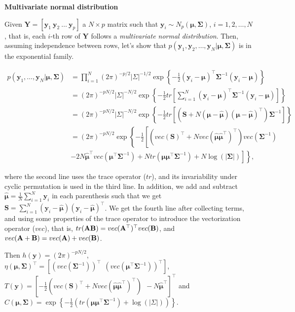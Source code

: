 \begin{enumerate}
\textbf{Multivariate normal distribution}

Given $\mathbf{Y}=[\mathbf{y}_1 \ \mathbf{y}_2 \ \dots \ \mathbf{y}_p]$ a $N\times p$ matrix such that $\mathbf{y}_i\sim N_p(\bm{\mu},\bm{\Sigma})$, $i=1,2,\dots,N$, that is, each $i$-th row of $\mathbf{Y}$ follows a \textit{multivariate normal distribution}. Then, assuming independence between rows, let's show that $p(\mathbf{y}_1,\mathbf{y}_2,\dots,\mathbf{y}_N|\bm{\mu},\bm{\Sigma})$ is in the exponential family.

{\footnotesize{
\begin{align}
	p(\mathbf{y}_1,\dots,\mathbf{y}_N|\bm{\mu},\bm{\Sigma})&=\prod_{i=1}^N (2\pi)^{-p/2}|\Sigma|^{-1/2}\exp\left\{-\frac{1}{2}\left(\mathbf{y}_i-\bm{\mu}\right)^{\top}\bm{\Sigma}^{-1}\left(\mathbf{y}_i-\bm{\mu}\right)\right\}\nonumber\\
	&= (2\pi)^{-pN/2}|\Sigma|^{-N/2}\exp\left\{-\frac{1}{2}tr\left[\sum_{i=1}^N\left(\mathbf{y}_i-\bm{\mu}\right)^{\top}\bm{\Sigma}^{-1}\left(\mathbf{y}_i-\bm{\mu}\right)\right]\right\}\nonumber\\
	&= (2\pi)^{-p N/2}|\Sigma|^{-N/2}\exp\left\{-\frac{1}{2}tr\left[\left(\mathbf{S}+N\left(\bm{\mu}-\hat{\bm{\mu}}\right)\left(\bm{\mu}-\hat{\bm{\mu}}\right)^{\top}\right)\bm{\Sigma}^{-1}\right]\right\}\nonumber\\
	&= (2\pi)^{-p N/2}\exp\left\{-\frac{1}{2}\left[\left(vec\left(\mathbf{S}\right)^{\top}+N vec\left(\hat{\bm{\mu}}\hat{\bm{\mu}}^{\top}\right)^{\top}\right)vec \left(\bm{\Sigma}^{-1}\right)\right.\right.\nonumber\\
	&\left.\left.-2N\hat{\bm{\mu}}^{\top}vec\left(\bm{\mu}^{\top}\bm{\Sigma}^{-1}\right)+N tr\left(\bm{\mu}\bm{\mu}^{\top}\bm{\Sigma}^{-1}\right)+N\log (|\bm{\Sigma}|)\right]\right\}\nonumber,
\end{align}
}}

where the second line uses the trace operator ($tr$), and its invariability under cyclic permutation is used in the third line. In addition, we add and subtract $\hat{\bm{\mu}}=\frac{1}{N}\sum_{i=1}^N\mathbf{y}_i$ in each parenthesis such that we get $\mathbf{S}=\sum_{i=1}^N\left(\mathbf{y}_i-\hat{\bm{\mu}}\right)\left(\mathbf{y}_i-\hat{\bm{\mu}}\right)^{\top}$. We get the fourth line after collecting terms, and using some properties of the trace operator to introduce the vectorization operator ($vec$), that is, $tr({\bf{AB}})=vec({\bf{A}}^{\top})^{\top}vec({\bf{B}})$, and $vec({\bf{A}}+{\bf{B}})=vec({\bf{A}})+vec({\bf{B}})$.

Then $h(\mathbf{y})=(2\pi)^{-pN/2}$, $\eta(\bm{\mu},\bm{\Sigma})^{\top}=\left[\left(vec\left(\bm{\Sigma}^{-1}\right)\right)^{\top} \ \ \left(vec\left(\bm{\mu}^{\top}\bm{\Sigma}^{-1}\right)\right)^{\top}\right]$, $T(\mathbf{y})=\left[-\frac{1}{2}\left(vec\left(\mathbf{S}\right)^{\top}+N vec\left(\hat{\bm{\mu}}\hat{\bm{\mu}}^{\top}\right)^{\top}\right) \ \ -N\hat{\bm{\mu}}^{\top}\right]^{\top}$ and $C(\bm{\mu},\bm{\Sigma})=\exp\left\{-\frac{1}{2}\left(tr\left(\bm{\mu}\bm{\mu}^{\top}\bm{\Sigma}^{-1}\right)+\log(|\Sigma|)\right)\right\}$.
\end{enumerate}

